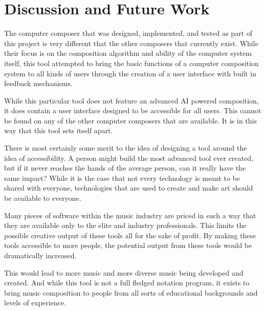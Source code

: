 \chapter{Discussion and Future Work}  
\label{ch:discussionandfuturework}

The computer composer that was designed, implemented, and tested as part of this project is very different that the other composers that currently exist.  While their focus is on the composition algorithm and ability of the computer system itself, this tool attempted to bring the basic functions of a computer composition system to all kinds of users through the creation of a user interface with built in feedback mechanisms.

\vspace{\baselineskip}

While this particular tool does not feature an advanced AI powered composition, it does contain a user interface designed to be accessible for all users.  This cannot be found on any of the other computer composers that are available.  It is in this way that this tool sets itself apart.

\vspace{\baselineskip}

There is most certainly some merit to the idea of designing a tool around the idea of accessibility.  A person might build the most advanced tool ever created, but if it never reaches the hands of the average person, can it really have the same impact?  While it is the case that not every technology is meant to be shared with everyone, technologies that are used to create and make art should be available to everyone.

\vspace{\baselineskip}

Many pieces of software within the music industry are priced in such a way that they are available only to the elite and industry professionals.  This limits the possible creative output of these tools all for the sake of profit.  By making these tools accessible to more people, the potential output from these tools would be dramatically increased.

\vspace{\baselineskip}

This would lead to more music and more diverse music being developed and created.  And while this tool is not a full fledged notation program, it exists to bring music composition to people from all sorts of educational backgrounds and levels of experience.

